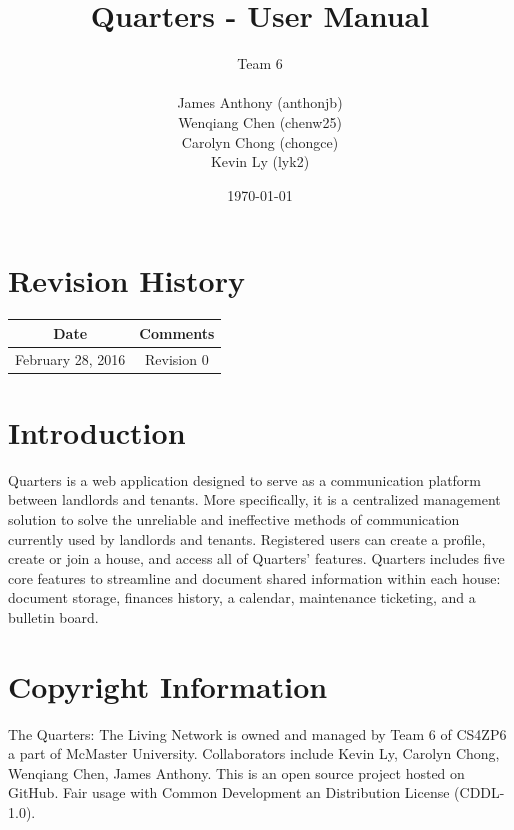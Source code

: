 \documentclass[12pt]{article}
\begin{document}
    \title{Quarters - User Manual}
    \author{Team 6\\ \\James Anthony (anthonjb)\\ Wenqiang Chen (chenw25)\\ Carolyn Chong
        (chongce)\\ Kevin Ly (lyk2)}
    \date{\today}

    \maketitle

    \pagebreak

    \tableofcontents
    \listoffigures

    \section*{Revision History}
    \begin{tabular}{|c|c|}
        \hline
        \textbf{Date}  & \textbf{Comments} \\ \hline
        February 28, 2016 & Revision 0 \\ \hline
    \end{tabular}

    \pagebreak


    \section{Introduction}
	Quarters is a web application designed to serve as a communication platform between landlords and tenants. More specifically, it is a centralized management solution to solve the unreliable and ineffective methods of communication currently used by landlords and tenants. Registered users can create a profile, create or join a house, and access all of Quarters’ features. Quarters includes five core features to streamline and document shared information within each house: document storage, finances history, a calendar, maintenance ticketing, and a bulletin board.

    \section{Copyright Information}
    The Quarters: The Living Network is owned and managed by Team 6 of CS4ZP6 a part of McMaster University. Collaborators include Kevin Ly, Carolyn Chong, Wenqiang Chen, James Anthony. This is an open source project hosted on GitHub. Fair usage with Common Development an Distribution License (CDDL-1.0).
\end{document}
